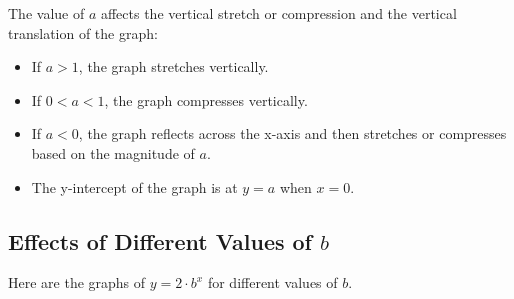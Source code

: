 \documentclass{article}
\begin{document}
\begin{center}
\end{center}

The value of \(a\) affects the vertical stretch or compression and the vertical translation of the graph:
\begin{itemize}
    \item If \(a > 1\), the graph stretches vertically.
    \item If \(0 < a < 1\), the graph compresses vertically.
    \item If \(a < 0\), the graph reflects across the x-axis and then stretches or compresses based on the magnitude of \(a\).
    \item The y-intercept of the graph is at \(y = a\) when \(x = 0\).
\end{itemize}

\newpage

\subsection*{Effects of Different Values of \(b\)}
Here are the graphs of \(y = 2 \cdot b^x\) for different values of \(b\).
\end{document}
